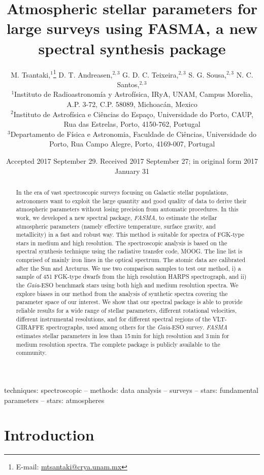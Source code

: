 \documentclass[fleqn,usenatbib]{mnras}
\title[Stellar parameters using FASMA]{Atmospheric stellar parameters for large surveys using FASMA, a new spectral synthesis package}
\author[M. Tsantaki et al.]{
M. Tsantaki,$^{1}$\thanks{E-mail: \href{mailto:mtsantaki@crya.unam.mx}{mtsantaki@crya.unam.mx}}
D. T. Andreasen,$^{2,3}$
G. D. C. Teixeira,$^{2,3}$
S. G. Sousa,$^{2,3}$ 
N. C. Santos,$^{2,3}$
\newauthor{E. Delgado-Mena,$^{2}$
G. Bruzual$^{1}$}
\\
$^{1}$Instituto de Radioastronom\'ia y Astrof\'isica, IRyA, UNAM, Campus Morelia, A.P. 3-72, C.P. 58089, Michoac\'an, Mexico \\
$^{2}$Instituto de Astrof\'isica e Ci\^encias do Espa\c{c}o, Universidade do Porto, CAUP, Rua das Estrelas, Porto, 4150-762, Portugal \\ 
$^{3}$Departamento de F\'isica e Astronomia, Faculdade de Ci\^encias, Universidade do Porto, Rua Campo Alegre, Porto, 4169-007, Portugal 
}
\date{Accepted 2017 September 29. Received 2017 September 27; in original form 2017 January 31}
\begin{document}
\label{firstpage}
\pagerange{\pageref{firstpage}--\pageref{lastpage}}
\maketitle

\begin{abstract}
In the era of vast spectroscopic surveys focusing on Galactic stellar populations, astronomers want to exploit the large quantity and good quality of data to derive their atmospheric 
parameters without losing precision from automatic procedures. In this work, we developed a new spectral package, \textit{FASMA}, to estimate the stellar atmospheric parameters 
(namely effective temperature, surface gravity, and metallicity) in a fast and robust way. This method is suitable for spectra of FGK-type stars in medium and high resolution. 
The spectroscopic analysis is based on the spectral synthesis technique using the radiative transfer code, MOOG. The line list is comprised of mainly iron lines in the optical 
spectrum. The atomic data are calibrated after the Sun and Arcturus. We use two comparison samples to test our method, i) a sample of 451 FGK-type dwarfs from the high resolution 
HARPS spectrograph, and ii) the \textit{Gaia}-ESO benchmark stars using both high and medium resolution spectra. We explore biases in our method from the analysis of synthetic spectra 
covering the parameter space of our interest. We show that our spectral package is able to provide reliable results for a wide range of stellar parameters, different rotational velocities, 
different instrumental resolutions, and for different spectral regions of the VLT-GIRAFFE spectrographs, used among others for the \textit{Gaia}-ESO survey. \textit{FASMA} estimates stellar 
parameters in less than 15\,min for high resolution and 3\,min for medium resolution spectra. The complete package is publicly available to the community.
\end{abstract}

\begin{keywords}
techniques: spectroscopic -- methods: data analysis -- surveys -- stars: fundamental parameters -- stars: atmospheres
\end{keywords}


\section{Introduction}\label{intro}
\end{document}
